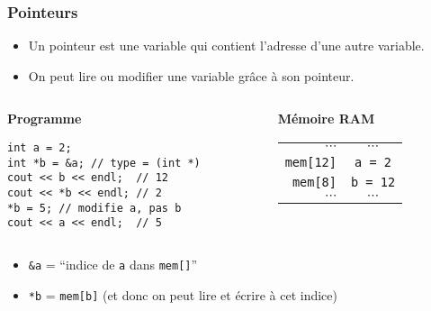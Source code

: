 \documentclass[12pt]{beamer}
\begin{document}
\begin{frame}[fragile]
\frametitle{Pointeurs}
\begin{itemize}
\item Un pointeur est une variable qui contient l'adresse d'une autre variable.
\item On peut lire ou modifier une variable grâce à son pointeur.
\end{itemize}
\vspace{6pt}
\begin{columns}[T]
\begin{column}{.6\textwidth}
\textbf{Programme}
\begin{lstlisting}
int a = 2;
int *b = &a; // type = (int *)
cout << b << endl;  // 12
cout << *b << endl; // 2
*b = 5; // modifie a, pas b
cout << a << endl;  // 5
\end{lstlisting}
\end{column}
\begin{column}{.3\textwidth}
\textbf{Mémoire RAM}
\vspace{7pt}

\begin{tabu}{r|c|}
$\cdots$ & $\cdots$ \\
\lstinline|mem[12]| & \lstinline|a = 2| \\
\lstinline|mem[8]| & \lstinline|b = 12| \\
$\cdots$ & $\cdots$
\end{tabu}
\end{column}
\end{columns}
\vspace{3pt}
\begin{itemize}
\item \lstinline|&a| = ``indice de \lstinline|a| dans \lstinline|mem[]|''
\item \lstinline|*b| = \lstinline|mem[b]| (et donc on peut lire et écrire à cet indice)
\end{itemize}
\end{frame}
\end{document}
